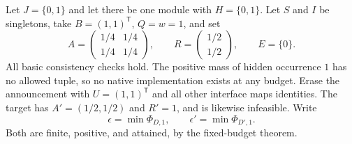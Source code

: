 \documentclass[11pt]{article}
\theoremstyle{remark}
\begin{document}
Let $J=\{0,1\}$ and let there be one module with $H=\{0,1\}$. Let $S$ and $I$ be singletons, take $B=(1,1)^{\mathsf T}$, $Q=w=1$, and set
\[
 A=\begin{pmatrix}1/4&1/4\\1/4&1/4\end{pmatrix},\qquad
 R=\begin{pmatrix}1/2\\1/2\end{pmatrix},\qquad E=\{0\}.
\]
All basic consistency checks hold. The positive mass of hidden occurrence $1$ has no allowed tuple, so no native implementation exists at any budget. Erase the announcement with $U=(1,1)^{\mathsf T}$ and all other interface maps identities. The target has $A'=(1/2,1/2)$ and $R'=1$, and is likewise infeasible. Write
\[
 \epsilon=\min\Phi_{D,1},\qquad \epsilon'=\min\Phi_{D',1}.
\]
Both are finite, positive, and attained, by the fixed-budget theorem.
\end{document}
